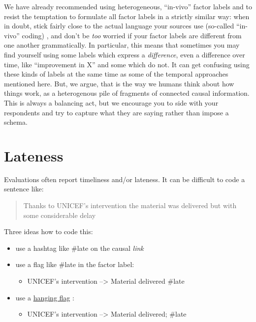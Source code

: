 \documentclass[
]{book}
\providecommand{\tightlist}{%
  \setlength{\itemsep}{0pt}\setlength{\parskip}{0pt}}
\begin{document}
We have already recommended using heterogeneous, ``in-vivo'' factor labels and to resist the temptation to formulate all factor labels in a strictly similar way: when in doubt, stick fairly close to the actual language your sources use (so-called ``in-vivo'' coding) , and don't be \emph{too} worried if your factor labels are different from one another grammatically. In particular, this means that sometimes you may find yourself using some labels which express a \emph{difference}, even a difference over time, like ``improvement in X'' and some which do not. It can get confusing using these kinds of labels at the same time as some of the temporal approaches mentioned here. But, we argue, that is the way we humans think about how things work, as a heterogenous pile of fragments of connected causal information. This is always a balancing act, but we encourage you to side with your respondents and try to capture what they are saying rather than impose a schema.

\hypertarget{xlateness}{%
\section{Lateness}\label{xlateness}}

Evaluations often report timeliness and/or lateness. It can be difficult to code a sentence like:

\begin{quote}
Thanks to UNICEF's intervention the material was delivered but with some considerable delay
\end{quote}

Three ideas how to code this:

\begin{itemize}
\tightlist
\item
  use a hashtag like \#late on the causal \emph{link}
\item
  use a flag like \#late in the factor label:

  \begin{itemize}
  \tightlist
  \item
    UNICEF's intervention --\textgreater{} Material delivered \#late
  \end{itemize}
\item
  use a \protect\hyperlink{hanging-flags}{hanging flag} :

  \begin{itemize}
  \tightlist
  \item
    UNICEF's intervention --\textgreater{} Material delivered; \#late
  \end{itemize}
\end{itemize}
\end{document}
